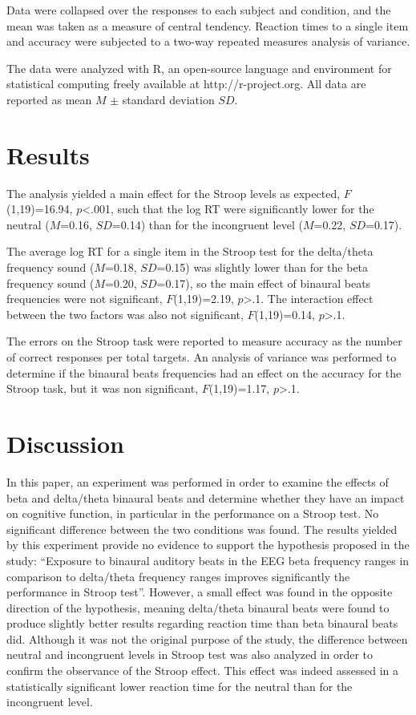 \documentclass[10pt]{article}
\begin{document}
Data were collapsed over the responses to each subject and condition, and the mean was taken as a measure of central tendency. Reaction times to a single item and accuracy were subjected to a two-way repeated measures analysis of variance.

The data were analyzed with R, an open-source language and environment for statistical computing freely available at http://r-project.org. All data are reported as mean \(M\) $\pm$ standard deviation \(SD\).

\section*{Results}

The analysis yielded a main effect for the Stroop levels as expected, \(F\)(1,19)=16.94, \(p\)\textless.001, such that the log RT were significantly lower for the neutral (\(M\)=0.16, \(SD\)=0.14) than for the incongruent level (\(M\)=0.22, \(SD\)=0.17).

The average log RT for a single item in the Stroop test for the delta/theta frequency sound (\(M\)=0.18, \(SD\)=0.15) was slightly lower than for the beta frequency sound (\(M\)=0.20, \(SD\)=0.17), so the main effect of binaural beats frequencies were not significant, \(F\)(1,19)=2.19, \(p\)\textgreater.1. The interaction effect between the two factors was also not significant, \(F\)(1,19)=0.14, \(p\)\textgreater.1.

The errors on the Stroop task were reported to measure accuracy as the number of correct responses per total targets. An analysis of variance was performed to determine if the binaural beats frequencies had an effect on the accuracy for the Stroop task, but it was non significant, \(F\)(1,19)=1.17, \(p\)\textgreater.1.

\section*{Discussion}
In this paper, an experiment was performed in order to examine the effects of beta and delta/theta binaural beats and determine whether they have an impact on cognitive function, in particular in the performance on a Stroop test. No significant difference between the two conditions was found. The results yielded by this experiment provide no evidence to support the hypothesis proposed in the study: “Exposure to binaural auditory beats in the EEG beta frequency ranges in comparison to delta/theta frequency ranges improves significantly the performance in Stroop test”. However, a small effect was found in the opposite direction of the hypothesis, meaning delta/theta binaural beats were found to produce slightly better results regarding reaction time than beta binaural beats did. Although it was not the original purpose of the study, the difference between neutral and incongruent levels in Stroop test was also analyzed in order to confirm the observance of the Stroop effect. This effect was indeed assessed in a statistically significant lower reaction time for the neutral than for the incongruent level.
\end{document}

